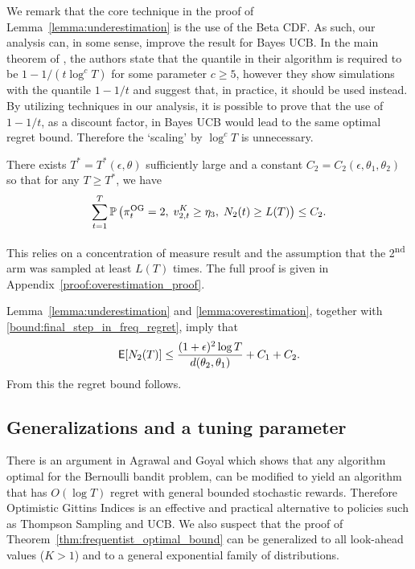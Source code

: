 \begin{myproof}[Proof.]
\begin{myproof}
		We remark that the core technique in the proof of Lemma~\ref{lemma:underestimation} is the use of the Beta CDF. As such, our analysis can, in some sense, improve the result for Bayes UCB. In the main theorem of \cite{kaufmann2012thompson}, the authors state that the quantile in their algorithm is required to be $1 - 1/(t \log^c T)$ for some parameter $c \ge 5$, however they show simulations with the quantile $1 -1/t$ and suggest that, in practice, it should be used instead. By utilizing techniques in our analysis, it is possible to prove that the use of $1-1/t$, as a discount factor, in Bayes UCB would lead to the same optimal regret bound. Therefore the `scaling' by $\log^c T$ is unnecessary.
	\end{myproof}
	\begin{lemma} \label{lemma:overestimation}
		There exists $T^* = T^*(\epsilon, \theta)$ sufficiently large and a constant $C_2 = C_2(\epsilon, \theta_1, \theta_2)$ so that for any $T \ge T^*$, we have
		\begin{equation*}
		\sum_{t=1}^T \P{\pi_t^{\rm OG} = 2,\; v^K_{2,t} \ge \eta_3, \; N_2(t) \ge L(T)} \le C_2.
		\end{equation*}
	\end{lemma}
	\begin{myproof}
		This relies on a concentration of measure result and the assumption that the 2\textsuperscript{nd} arm was sampled at least $L(T)$ times. The full proof is given in Appendix~\ref{proof:overestimation_proof}.
	\end{myproof}
	Lemma~\ref{lemma:underestimation} and \ref{lemma:overestimation}, together with \eqref{bound:final_step_in_freq_regret}, imply that
	\[
	\E[N_2(T)] \le \frac{(1+\epsilon)^2 \log T}{d(\theta_2, \theta_1)} +  C_1 +  C_2.
	\]
	From this the regret bound follows.
\end{myproof}
\subsection{Generalizations and a tuning parameter}
There is an argument in Agrawal and Goyal \cite{agrawalanalysis} which shows that any algorithm optimal for the Bernoulli bandit problem, can be modified to yield an algorithm that has $O(\log T)$ regret with general bounded stochastic rewards. Therefore Optimistic Gittins Indices is an effective and practical alternative to policies such as Thompson Sampling and UCB. We also suspect that the proof of Theorem~\ref{thm:frequentist_optimal_bound} can be generalized to all look-ahead values ($K > 1$) and to a general exponential family of distributions.

